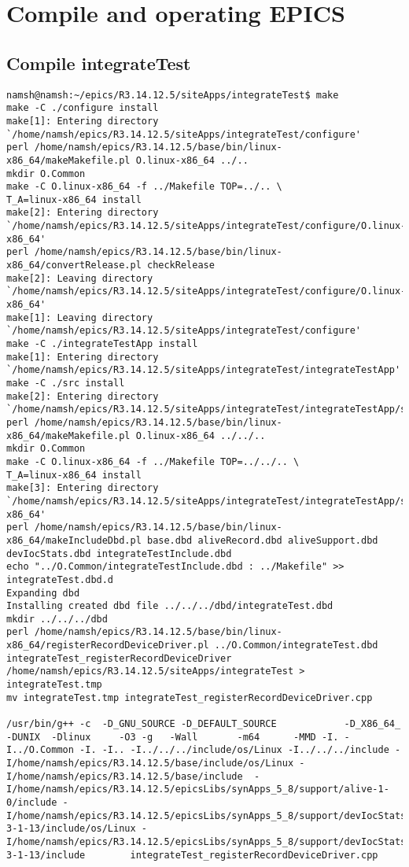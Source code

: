 \documentclass[11pt
  , a4paper
  , article
  , oneside
]{memoir}
\begin{document}
\chapter{Compile and operating EPICS}

\section{Compile integrateTest}

\begin{lstlisting}[style=termstyle]
namsh@namsh:~/epics/R3.14.12.5/siteApps/integrateTest$ make
make -C ./configure install 
make[1]: Entering directory `/home/namsh/epics/R3.14.12.5/siteApps/integrateTest/configure'
perl /home/namsh/epics/R3.14.12.5/base/bin/linux-x86_64/makeMakefile.pl O.linux-x86_64 ../..
mkdir O.Common
make -C O.linux-x86_64 -f ../Makefile TOP=../.. \
T_A=linux-x86_64 install
make[2]: Entering directory `/home/namsh/epics/R3.14.12.5/siteApps/integrateTest/configure/O.linux-x86_64'
perl /home/namsh/epics/R3.14.12.5/base/bin/linux-x86_64/convertRelease.pl checkRelease
make[2]: Leaving directory `/home/namsh/epics/R3.14.12.5/siteApps/integrateTest/configure/O.linux-x86_64'
make[1]: Leaving directory `/home/namsh/epics/R3.14.12.5/siteApps/integrateTest/configure'
make -C ./integrateTestApp install 
make[1]: Entering directory `/home/namsh/epics/R3.14.12.5/siteApps/integrateTest/integrateTestApp'
make -C ./src install 
make[2]: Entering directory `/home/namsh/epics/R3.14.12.5/siteApps/integrateTest/integrateTestApp/src'
perl /home/namsh/epics/R3.14.12.5/base/bin/linux-x86_64/makeMakefile.pl O.linux-x86_64 ../../..
mkdir O.Common
make -C O.linux-x86_64 -f ../Makefile TOP=../../.. \
T_A=linux-x86_64 install
make[3]: Entering directory `/home/namsh/epics/R3.14.12.5/siteApps/integrateTest/integrateTestApp/src/O.linux-x86_64'
perl /home/namsh/epics/R3.14.12.5/base/bin/linux-x86_64/makeIncludeDbd.pl base.dbd aliveRecord.dbd aliveSupport.dbd devIocStats.dbd integrateTestInclude.dbd
echo "../O.Common/integrateTestInclude.dbd : ../Makefile" >> integrateTest.dbd.d
Expanding dbd
Installing created dbd file ../../../dbd/integrateTest.dbd
mkdir ../../../dbd
perl /home/namsh/epics/R3.14.12.5/base/bin/linux-x86_64/registerRecordDeviceDriver.pl ../O.Common/integrateTest.dbd integrateTest_registerRecordDeviceDriver /home/namsh/epics/R3.14.12.5/siteApps/integrateTest > integrateTest.tmp
mv integrateTest.tmp integrateTest_registerRecordDeviceDriver.cpp

/usr/bin/g++ -c  -D_GNU_SOURCE -D_DEFAULT_SOURCE            -D_X86_64_  -DUNIX  -Dlinux     -O3 -g   -Wall       -m64      -MMD -I. -I../O.Common -I. -I.. -I../../../include/os/Linux -I../../../include -I/home/namsh/epics/R3.14.12.5/base/include/os/Linux -I/home/namsh/epics/R3.14.12.5/base/include  -I/home/namsh/epics/R3.14.12.5/epicsLibs/synApps_5_8/support/alive-1-0/include -I/home/namsh/epics/R3.14.12.5/epicsLibs/synApps_5_8/support/devIocStats-3-1-13/include/os/Linux -I/home/namsh/epics/R3.14.12.5/epicsLibs/synApps_5_8/support/devIocStats-3-1-13/include        integrateTest_registerRecordDeviceDriver.cpp 


\end{lstlisting}
\end{document}
